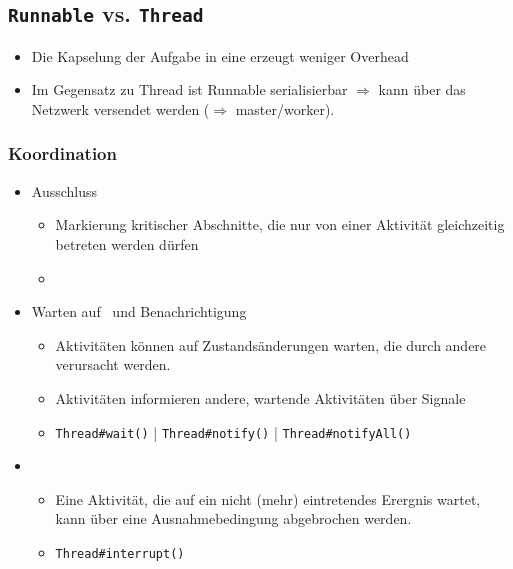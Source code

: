 \subsection{\texttt{Runnable} vs. \texttt{Thread}}
\begin{itemize}
    \item Die Kapselung der Aufgabe in eine  erzeugt weniger Overhead
    \item Im Gegensatz zu Thread ist Runnable serialisierbar $\Rightarrow$ kann über das Netzwerk versendet werden ($\Rightarrow$ master/worker).
\end{itemize}

\subsubsection{Koordination}
\begin{itemize}
    \item {} Ausschluss
    \begin{itemize}
        \item Markierung kritischer Abschnitte, die nur von einer Aktivität gleichzeitig betreten werden dürfen
        \item {}
    \end{itemize}
    \item Warten auf \glqq{}\grqq\ und Benachrichtigung
    \begin{itemize}
        \item Aktivitäten können auf Zustandsänderungen warten, die durch andere verursacht werden.
        \item Aktivitäten informieren andere, wartende Aktivitäten über Signale
        \item \texttt{Thread\#wait()} | \texttt{Thread\#notify()} | \texttt{Thread\#notifyAll()}
    \end{itemize}
    \item {}
    \begin{itemize}
        \item Eine Aktivität, die auf ein nicht (mehr) eintretendes Erergnis wartet, kann über eine Ausnahmebedingung abgebrochen werden.
        \item \texttt{Thread\#interrupt()}
    \end{itemize}
\end{itemize}

\newpage

